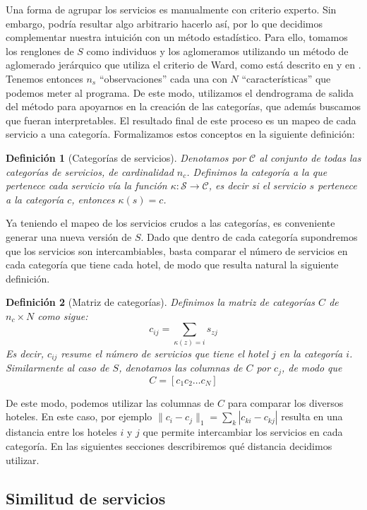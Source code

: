 \documentclass[12pt]{report}
\newtheorem{defn}{Definici\'on}[chapter]
\begin{document}
Una forma de agrupar los servicios es manualmente con criterio experto. Sin embargo, podría resultar algo arbitrario hacerlo así, por lo que decidimos complementar nuestra intuición con un método estadístico. Para ello, tomamos los renglones de $S$ como individuos y los aglomeramos utilizando un método de aglomerado jerárquico que utiliza el criterio de Ward, como está descrito en \cite{ward} y en \cite{ward-notes}. Tenemos entonces $n_s$ ``observaciones'' cada una con $N$ ``características'' que podemos meter al programa. De este modo, utilizamos el dendrograma de salida del método para apoyarnos en la creación de las categorías, que además buscamos que fueran interpretables. El resultado final de este proceso es un mapeo de cada servicio a una categoría. Formalizamos estos conceptos en la siguiente definición:
\begin{defn}[Categorías de servicios]
Denotamos por $\mathcal{C}$ al conjunto de todas las categorías de servicios, de cardinalidad $n_c$. Definimos la categoría a la que pertenece cada servicio vía la función $\kappa: \mathcal{S} \to \mathcal{C}$, es decir si el servicio $s$ pertenece a la categoría $c$, entonces $\kappa(s) = c$.
\end{defn}
Ya teniendo el mapeo de los servicios crudos a las categorías, es conveniente generar una nueva versión de $S$. Dado que dentro de cada categoría supondremos que los servicios son intercambiables, basta comparar el número de servicios en cada categoría que tiene cada hotel, de modo que resulta natural la siguiente definición.
\begin{defn}[Matriz de categorías]
Definimos la matriz de categorías $C$ de $n_c \times N$ como sigue:
\[
c_{ij} = \sum_{\kappa(z) = i} s_{zj}
\]
Es decir, $c_{ij}$ resume el número de servicios que tiene el hotel $j$ en la categoría $i$. Similarmente al caso de $S$, denotamos las columnas de $C$ por $c_j$, de modo que
\[
C = [c_1 c_2 \dots c_N]
\]
\end{defn}
De este modo, podemos utilizar las columnas de $C$ para comparar los diversos hoteles. En este caso, por ejemplo $\|c_i - c_j\|_1 = \sum_k |c_{ki} - c_{kj}|$ resulta en una distancia entre los hoteles $i$ y $j$ que permite intercambiar los servicios en cada categoría. En las siguientes secciones describiremos qué distancia decidimos utilizar.

\subsection*{Similitud de servicios}
\end{document}
